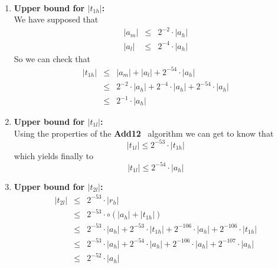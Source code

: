 \documentclass[a4paper,10pt,twoside]{article}
\newenvironment{proof}[1][Proof]{\begin{trivlist}
\item[\hskip \labelsep {\bfseries #1}]}{\end{trivlist}}
\newcommand{\hi}{\ensuremath{\mathit{h}}}
\newcommand{\mi}{\ensuremath{\mathit{m}}}
\newcommand{\lo}{\ensuremath{\mathit{l}}}
\newcommand{\Add}{{\bf Add12}}
\begin{document}
\begin{proof} ~\\
\begin{enumerate}
\item {\bf Upper bound for $\left \vert t_{1\hi} \right \vert$:}\\
We have supposed that 
\begin{eqnarray*}
\left \vert a_\mi \right \vert & \leq & 2^{-2} \cdot \left \vert a_\hi \right \vert \\
\left \vert a_\lo \right \vert & \leq & 2^{-4} \cdot \left \vert a_\hi \right \vert 
\end{eqnarray*}
So we can check that
\begin{eqnarray*}
\left \vert t_{1\hi} \right \vert & \leq & \left \vert a_\mi \right \vert + \left \vert a_\lo \right \vert + 
2^{-54} \cdot \left \vert a_\hi \right \vert\\
& \leq & 2^{-2} \cdot \left \vert a_\hi \right \vert + 2^{-4} \cdot \left \vert a_\hi \right \vert + 
2^{-54} \cdot \left \vert a_\hi \right \vert \\
& \leq & 2^{-1} \cdot \left \vert a_\hi \right \vert
\end{eqnarray*}
\item {\bf Upper bound for $\left \vert t_{1\lo} \right \vert$:}\\
Using the properties of the \Add~ algorithm we can get to know that
$$\left \vert t_{1\lo} \right \vert \leq 2^{-53} \cdot \left \vert t_{1\hi} \right \vert$$
which yields finally to
$$\left \vert t_{1\lo} \right \vert \leq 2^{-54} \cdot \left \vert a_\hi \right \vert$$
\item {\bf Upper bound for $\left \vert t_{2\lo} \right \vert$:}
\begin{eqnarray*}
\left \vert t_{2\lo} \right \vert & \leq & 2^{-53} \cdot \left \vert r_\hi \right \vert \\
& \leq & 2^{-53} \cdot \circ \left( \left \vert a_\hi \right \vert + \left \vert t_{1\hi} \right \vert \right) \\
& \leq & 2^{-53} \cdot \left \vert a_\hi \right \vert + 2^{-53} \cdot \left \vert t_{1\hi} \right \vert + 2^{-106} \cdot \left \vert a_\hi \right \vert +
2^{-106} \cdot \left \vert t_{1\hi} \right \vert \\
& \leq & 2^{-53} \cdot \left \vert a_\hi \right \vert + 2^{-54} \cdot \left \vert a_\hi \right \vert + 2^{-106} \cdot \left \vert a_\hi \right \vert +
2^{-107} \cdot \left \vert a_\hi \right \vert \\
& \leq & 2^{-52} \cdot \left \vert a_\hi \right \vert

\end{eqnarray*}
\end{enumerate}
\end{proof}
\end{document}
